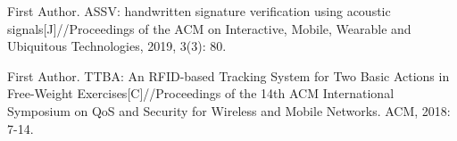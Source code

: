 
\begin{publications}{99}
    \item {First Author}. {ASSV: handwritten signature verification using acoustic signals}[J]//Proceedings of the ACM on Interactive, Mobile, Wearable and Ubiquitous Technologies, 2019, 3(3): 80.
    \item {First Author}. {TTBA: An RFID-based Tracking System for Two Basic Actions in Free-Weight Exercises}[C]//Proceedings of the 14th ACM International Symposium on QoS and Security for Wireless and Mobile Networks. ACM, 2018: 7-14.
\end{publications}
